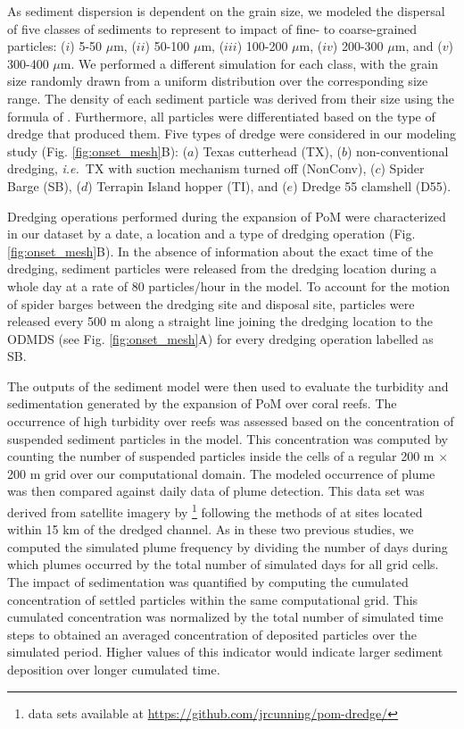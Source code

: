 \documentclass[preprint,12pt,authoryear]{elsarticle}
\newcommand{\ie}{{\it i.e.}\ }
\begin{document}
As sediment dispersion is dependent on the grain size, we modeled the dispersal of five classes of sediments to represent to impact of fine- to coarse-grained particles: ($i$) 5-50 $\mu$m, ($ii$) 50-100 $\mu$m, ($iii$) 100-200 $\mu$m, ($iv$) 200-300 $\mu$m, and ($v$) 300-400 $\mu$m. We performed a  different simulation for each class, with the grain size randomly drawn from a uniform distribution over the corresponding size range. The density of each sediment particle was derived from their size using the formula of \cite{hamilton1982sound}. Furthermore, all particles were differentiated based on the type of dredge that produced them. Five types of dredge were considered in our modeling study (Fig. \ref{fig:onset_mesh}B): ($a$) Texas cutterhead (TX), ($b$) non-conventional dredging, \ie TX with suction mechanism turned off (NonConv), ($c$) Spider Barge (SB), ($d$) Terrapin Island hopper (TI), and ($e$) Dredge 55 clamshell (D55).

Dredging operations performed during the expansion of PoM were characterized in our dataset by a date, a location and  a type of dredging operation (Fig. \ref{fig:onset_mesh}B). In the absence of information about the exact time of the dredging, sediment particles were released from the dredging location during a whole day at a rate of 80 particles/hour in the model. To account for the motion of spider barges between the dredging site and disposal site, particles were released every 500 m along a straight line joining the dredging location to the ODMDS (see Fig. \ref{fig:onset_mesh}A) for every dredging operation labelled as SB.

The outputs of the sediment model were then used to evaluate the turbidity and sedimentation generated by the expansion of PoM over coral reefs. The occurrence of high turbidity over reefs was assessed based on the concentration of suspended sediment particles in the model. This concentration was computed by counting the number of suspended particles inside the cells of a regular 200 m $\times$ 200 m grid over our computational domain. The modeled occurrence of plume was then compared against daily data of plume detection. This data set was derived from satellite imagery by \cite{cunning2019extensive}\footnote{data sets available at \url{https://github.com/jrcunning/pom-dredge/}} following the methods of \cite{barnes2015sediment} at sites located within 15 km of the dredged channel. As in these two previous studies, we computed  the simulated plume frequency by dividing the number of days during which plumes occurred by the total number of simulated days for all grid cells. The impact of sedimentation was quantified by computing the cumulated concentration of settled particles within the same computational grid. This cumulated concentration was normalized by the total number of simulated time steps to obtained an averaged concentration of deposited particles over the simulated period. Higher values of this indicator would indicate larger sediment deposition over longer cumulated time.
\end{document}
